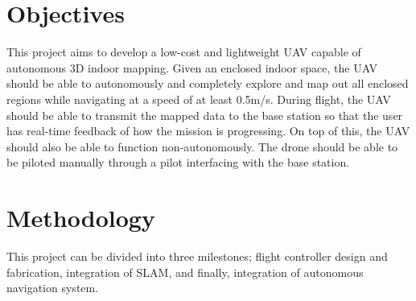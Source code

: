 \documentclass[english]{upeeei}
\begin{document}
\chapter{Objectives}
This project aims to develop a low-cost and lightweight UAV capable of autonomous 3D indoor mapping. Given an enclosed
indoor space, the UAV should be able to autonomously and completely explore and map out all enclosed regions while navigating at
a speed of at least 0.5m/s. 
During flight, the UAV should be able to transmit the mapped data to the base station so that the user has real-time feedback of
how the mission is progressing. On top of this, the UAV should also be able to function non-autonomously. The drone should be
able to be piloted manually through a pilot interfacing with the base station. 

\chapter{Methodology}
This project can be divided into three milestones; flight controller design and fabrication, integration of SLAM, and
finally, integration of autonomous navigation system.
\end{document}
